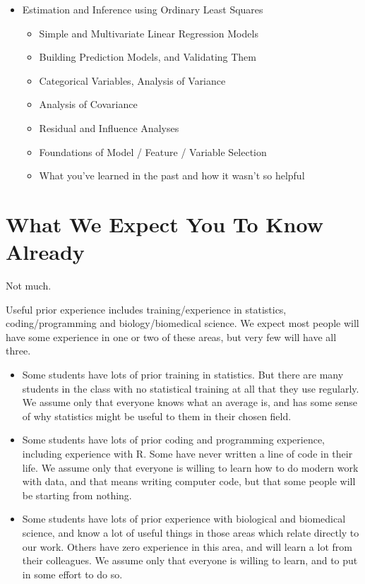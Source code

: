 \documentclass[
]{book}
\providecommand{\tightlist}{%
  \setlength{\itemsep}{0pt}\setlength{\parskip}{0pt}}
\begin{document}
\begin{itemize}
\tightlist
\item
  Estimation and Inference using Ordinary Least Squares

  \begin{itemize}
  \tightlist
  \item
    Simple and Multivariate Linear Regression Models
  \item
    Building Prediction Models, and Validating Them
  \item
    Categorical Variables, Analysis of Variance
  \item
    Analysis of Covariance
  \item
    Residual and Influence Analyses
  \item
    Foundations of Model / Feature / Variable Selection
  \item
    What you've learned in the past and how it wasn't so helpful
  \end{itemize}
\end{itemize}

\hypertarget{what-we-expect-you-to-know-already}{%
\section{What We Expect You To Know Already}\label{what-we-expect-you-to-know-already}}

Not much.

Useful prior experience includes training/experience in statistics, coding/programming and biology/biomedical science. We expect most people will have some experience in one or two of these areas, but very few will have all three.

\begin{itemize}
\tightlist
\item
  Some students have lots of prior training in statistics. But there are many students in the class with no statistical training at all that they use regularly. We assume only that everyone knows what an average is, and has some sense of why statistics might be useful to them in their chosen field.\\
\item
  Some students have lots of prior coding and programming experience, including experience with R. Some have never written a line of code in their life. We assume only that everyone is willing to learn how to do modern work with data, and that means writing computer code, but that some people will be starting from nothing.
\item
  Some students have lots of prior experience with biological and biomedical science, and know a lot of useful things in those areas which relate directly to our work. Others have zero experience in this area, and will learn a lot from their colleagues. We assume only that everyone is willing to learn, and to put in some effort to do so.
\end{itemize}
\end{document}
